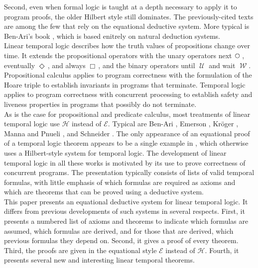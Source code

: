 \documentclass[fleqn, leqno]{article}
\newcommand{\Until}{\;\mathcal{U}\;}
\newcommand{\Wait}{\;\mathcal{W}\;}
\newcommand{\Next}{\;\,\text{\raisebox{3.5pt}{\circle{6}}}}
\newcommand{\Event}{\Diamond\,}
\newcommand{\Always}{\Box\,}
\begin{document}
Second, even when formal logic is taught at a depth necessary to apply it to program proofs, the older Hilbert style
still dominates.
The previously-cited texts \cite{Cohen, LADM, Kald} are among the few that rely on the equational deductive system.
More typical is Ben-Ari's book \cite{Ben}, which is based enitrely on natural deduction systems.\\

Linear temporal logic describes how the truth values of propositions change over time.
It extends the propositional operators with the unary operators next $\Next$, eventually $\Event$, and always $\Always$,
and the binary operators until $\Until$ and wait $\Wait$.
Propositional calculus applies to program correctness with the formulation of the Hoare triple to establish invariants
in programs that terminate.
Temporal logic applies to program correctness with concurrent processing to establish safety and liveness properties
in programs that possibly do not terminate.\\

As is the case for propositional and predicate calculus, most treatments of linear temporal logic use $\mathcal{H}$
instead of $\mathcal{E}$. Typical are Ben-Ari \cite{Ben2}, Emerson \cite{Emer}, Kr\"{o}ger \cite{Kroger},
Manna and Pnueli \cite{Manna}, and Schneider \cite{Schn}.
The only appearance of an equational proof of a temporal logic theorem appears to be a single example in \cite{Schn},
which otherwise uses a Hilbert-style system for temporal logic.
The development of linear temporal logic in all these works is motivated by its use to prove correctness of concurrent programs.
The presentation typically consists of lists of valid temporal formulas, with little emphasis of which formulas are required
as axioms and which are theorems that can be proved using a deductive system.\\

This paper presents an equational deductive system for linear temporal logic.
It differs from previous developments of such systems in several respects.
First, it presents a numbered list of axioms and theorems to indicate which formulas are assumed, which formulas are
derived, and for those that are derived, which previous formulas they depend on.
Second, it gives a proof of every theorem.
Third, the proofs are given in the equational style $\mathcal{E}$ instead of $\mathcal{H}$.
Fourth, it presents several new and interesting linear temporal theorems.\\
\end{document}
